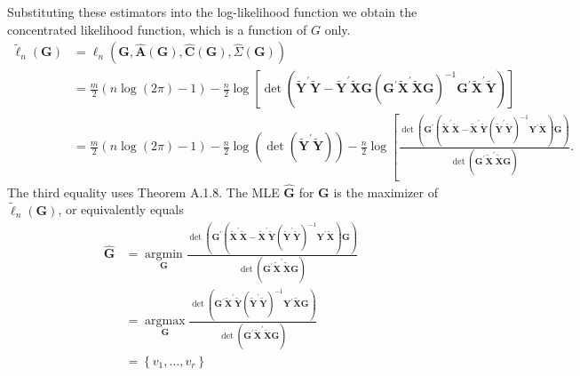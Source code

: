 \documentclass[10pt]{article}
\begin{document}
Substituting these estimators into the log-likelihood function we obtain the concentrated likelihood function, which is a function of $G$ only.
$$
\begin{aligned}
\widetilde{\ell}_{n}(\boldsymbol{G}) &=\ell_{n}(\boldsymbol{G}, \widehat{\boldsymbol{A}}(\boldsymbol{G}), \widehat{\boldsymbol{C}}(\boldsymbol{G}), \widehat{\Sigma}(\boldsymbol{G})) \\
&=\frac{m}{2}(n \log (2 \pi)-1)-\frac{n}{2} \log \left[\operatorname{det}\left(\widetilde{\boldsymbol{Y}}^{\prime} \widetilde{\boldsymbol{Y}}-\widetilde{\boldsymbol{Y}}^{\prime} \widetilde{\boldsymbol{X}} \boldsymbol{G}\left(\boldsymbol{G}^{\prime} \widetilde{\boldsymbol{X}}^{\prime} \widetilde{\boldsymbol{X}} \boldsymbol{G}\right)^{-1} \boldsymbol{G}^{\prime} \widetilde{\boldsymbol{X}}^{\prime} \widetilde{\boldsymbol{Y}}\right)\right] \\
&=\frac{m}{2}(n \log (2 \pi)-1)-\frac{n}{2} \log \left(\operatorname{det}\left(\widetilde{\boldsymbol{Y}}^{\prime} \widetilde{\boldsymbol{Y}}\right)\right)-\frac{n}{2} \log \left[\frac{\operatorname{det}\left(\boldsymbol{G}^{\prime}\left(\widetilde{\boldsymbol{X}}^{\prime} \widetilde{\boldsymbol{X}}-\widetilde{\boldsymbol{X}}^{\prime} \tilde{\boldsymbol{Y}}\left(\widetilde{\boldsymbol{Y}}^{\prime} \widetilde{\boldsymbol{Y}}\right)^{-1} \boldsymbol{Y}^{\prime} \widetilde{\boldsymbol{X}}\right) \boldsymbol{G}\right)}{\operatorname{det}\left(\boldsymbol{G}^{\prime} \widetilde{\boldsymbol{X}}^{\prime} \widetilde{\boldsymbol{X}} \boldsymbol{G}\right)} .\right.
\end{aligned}
$$
The third equality uses Theorem A.1.8. The MLE $\widehat{\boldsymbol{G}}$ for $\boldsymbol{G}$ is the maximizer of $\widetilde{\ell}_{n}(\boldsymbol{G})$, or equivalently equals
$$
\begin{aligned}
\widehat{\boldsymbol{G}} &=\underset{\boldsymbol{G}}{\operatorname{argmin}} \frac{\operatorname{det}\left(\boldsymbol{G}^{\prime}\left(\widetilde{\boldsymbol{X}}^{\prime} \widetilde{\boldsymbol{X}}-\widetilde{\boldsymbol{X}}^{\prime} \widetilde{\boldsymbol{Y}}\left(\tilde{\boldsymbol{Y}}^{\prime} \widetilde{\boldsymbol{Y}}\right)^{-1} \boldsymbol{Y}^{\prime} \tilde{\boldsymbol{X}}\right) \boldsymbol{G}\right)}{\operatorname{det}\left(\boldsymbol{G}^{\prime} \widetilde{\boldsymbol{X}}^{\prime} \widetilde{\boldsymbol{X}} \boldsymbol{G}\right)} \\
&=\underset{\boldsymbol{G}}{\operatorname{argmax}} \frac{\operatorname{det}\left(\boldsymbol{G}^{\prime} \widetilde{\boldsymbol{X}}^{\prime} \widetilde{\boldsymbol{Y}}\left(\widetilde{\boldsymbol{Y}}^{\prime} \widetilde{\boldsymbol{Y}}\right)^{-1} \boldsymbol{Y}^{\prime} \widetilde{\boldsymbol{X}} \boldsymbol{G}\right)}{\operatorname{det}\left(\boldsymbol{G}^{\prime} \widetilde{\boldsymbol{X}}^{\prime} \widetilde{\boldsymbol{X}} \boldsymbol{G}\right)} \\
&=\left\{v_{1}, \ldots, v_{r}\right\}
\end{aligned}
$$
\end{document}
